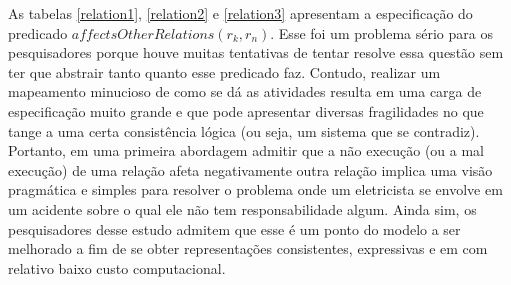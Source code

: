 As tabelas \ref{relation1}, \ref{relation2} e \ref{relation3} apresentam a especificação do predicado $affectsOtherRelations(r_k,r_n)$. Esse foi um problema sério para os pesquisadores porque houve muitas tentativas de tentar resolve essa questão sem ter que abstrair tanto quanto esse predicado faz. Contudo, realizar um mapeamento minucioso de como se dá as atividades resulta em uma carga de especificação muito grande e que pode apresentar diversas fragilidades no que tange a uma certa consistência lógica (ou seja, um sistema que se contradiz). Portanto, em uma primeira abordagem admitir que a não execução (ou a mal execução) de uma relação afeta negativamente outra relação implica uma visão pragmática e simples para resolver o problema onde um eletricista se envolve em um acidente sobre o qual ele não tem responsabilidade algum. Ainda sim, os pesquisadores desse estudo admitem que esse é um ponto do modelo a ser melhorado a fim de se obter representações consistentes, expressivas e em com relativo baixo custo computacional. 

